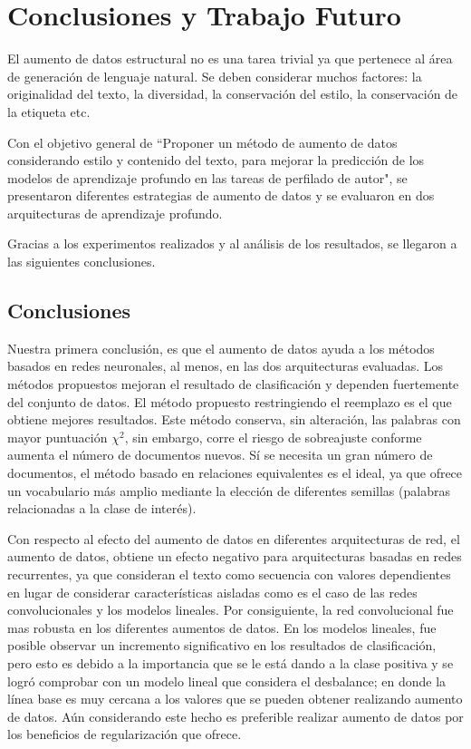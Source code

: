 
\chapter{Conclusiones y Trabajo Futuro}
El aumento de datos estructural no es una tarea trivial ya que pertenece al área de generación de lenguaje natural. Se deben considerar muchos factores: la originalidad del texto, la diversidad, la conservación del estilo, la conservación de la etiqueta etc. 

Con el objetivo general de ``Proponer un método de aumento de datos considerando  estilo y contenido del texto, para mejorar la predicción de los modelos de aprendizaje profundo en las tareas de perfilado de autor", se presentaron diferentes estrategias de aumento de datos y se evaluaron en dos arquitecturas de aprendizaje profundo. 

Gracias a los experimentos realizados y al análisis de los resultados, se llegaron a las siguientes conclusiones.

\section{Conclusiones}

Nuestra primera conclusión, es que el aumento de datos ayuda a los métodos basados en redes neuronales, al menos, en las dos arquitecturas evaluadas. Los métodos propuestos mejoran el resultado de clasificación y dependen fuertemente del conjunto de datos.
El método propuesto restringiendo el reemplazo es el que  obtiene mejores resultados. Este método conserva, sin alteración, las palabras con mayor puntuación $\chi^2$, sin embargo, corre el riesgo de sobreajuste conforme aumenta el número de documentos nuevos. Sí se necesita un gran número de documentos, el método basado en relaciones equivalentes es el ideal, ya que ofrece un vocabulario más amplio mediante la elección de diferentes semillas (palabras relacionadas a la clase de interés). 

Con respecto al efecto del aumento de datos en diferentes arquitecturas de red, el aumento de datos, obtiene un efecto negativo para arquitecturas basadas en redes recurrentes, ya que consideran el texto como secuencia con valores dependientes en lugar de considerar características aisladas como es el caso de las redes convolucionales y los modelos lineales. Por consiguiente, la red convolucional fue mas robusta en los diferentes aumentos de datos. En los modelos lineales, fue posible observar un incremento significativo en los resultados de clasificación, pero esto es debido a la importancia que se le está dando a la clase positiva y se logró comprobar con un modelo lineal que considera el desbalance; en donde la línea base es muy cercana a los valores que se pueden obtener realizando aumento de datos. Aún considerando este hecho es preferible realizar aumento de datos por los beneficios de regularización que ofrece.

